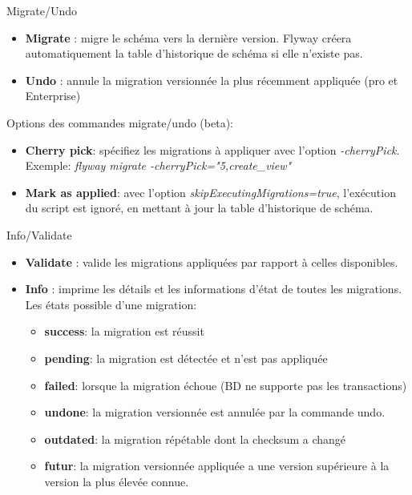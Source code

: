 \documentclass[slidestop,compress,11pt,xcolor=dvipsnames,french]{beamer}
\begin{document}
\begin{frame}{Migrate/Undo}
\begin{itemize}
 \item \textbf{Migrate} : migre le schéma vers la dernière version. Flyway créera automatiquement la table d'historique de schéma si elle n'existe pas.
 \item \textbf{Undo} : annule la migration versionnée la plus récemment appliquée (pro et Enterprise)
\end{itemize}
\vspace{1cm}
Options des commandes migrate/undo (beta):
\begin{itemize}
 \item \textbf{Cherry pick}: spécifiez les migrations à appliquer avec l'option \textit{-cherryPick}. Exemple: \textit{flyway migrate -cherryPick="5,create\_view"}
 \item \textbf{Mark as applied}: avec l'option \textit{skipExecutingMigrations=true}, l'exécution du script est ignoré, en mettant à jour la table d'historique de schéma.
\end{itemize}
\end{frame}
\begin{frame}{Info/Validate}
\begin{itemize}
 \item \textbf{Validate} : valide les migrations appliquées par rapport à celles disponibles.
 \item \textbf{Info} : imprime les détails et les informations d'état de toutes les migrations. Les états possible d'une migration:
    \begin{itemize}
        \item \textbf{success}: la migration est réussit
        \item \textbf{pending}: la migration est détectée et n'est pas appliquée 
        \item \textbf{failed}: lorsque la migration échoue (BD ne supporte pas les transactions) 
        \item \textbf{undone}: la migration versionnée est annulée par la commande undo.
        \item \textbf{outdated}: la migration répétable dont la checksum a changé
        \item \textbf{futur}:  la migration versionnée appliquée a une version supérieure à la version la plus élevée connue.
    \end{itemize}
\end{itemize}
\end{frame}
\end{document}
